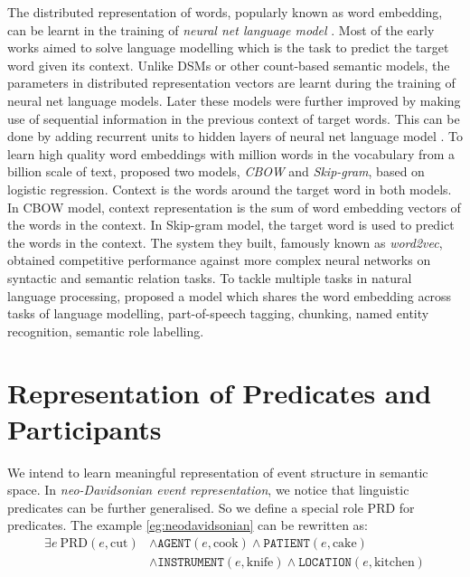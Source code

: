 \documentclass[a4paper]{article}
\begin{document}
The distributed representation of words, popularly known as word embedding, can be learnt in the training of \textit{neural net language model} \citep{bengio2003neural}. Most of the early works aimed to solve language modelling which is the task to predict the target word given its context. Unlike DSMs or other count-based semantic models, the parameters in distributed representation vectors are learnt during the training of neural net language models. Later these models were further improved by making use of sequential information in the previous context of target words. This can be done by adding recurrent units to hidden layers of neural net language model \citep{mikolov2010recurrent}. To learn high quality word embeddings with million words in the vocabulary from a billion scale of text, \citet{mikolov2013efficient} proposed two models, \textit{CBOW} and \textit{Skip-gram}, based on logistic regression. Context is the words around the target word in both models. In CBOW model, context representation is the sum of word embedding vectors of the words in the context. In Skip-gram model, the target word is used to predict the words in the context. The system they built, famously known as \textit{word2vec}, obtained competitive performance against more complex neural networks on syntactic and semantic relation tasks. To tackle multiple tasks in natural language processing, \citet{collobert2011natural} proposed a model which shares the word embedding across tasks of language modelling, part-of-speech tagging, chunking, named entity recognition, semantic role labelling. 



\newpage
\section{Representation of Predicates and Participants}
We intend to learn meaningful representation of event structure in semantic space. In \textit{neo-Davidsonian event representation}, we notice that linguistic predicates can be further generalised. So we define a special role PRD for predicates. The example \ref{eg:neodavidsonian} can be rewritten as: 
\begin{equation*} \label{eg:symbolic-thematic}
\begin{aligned}
    \exists e\ \text{PRD}(e, \text{cut})
    & \land \texttt{AGENT}(e, \text{cook}) \land \texttt{PATIENT}(e, \text{cake}) \\
    & \land \texttt{INSTRUMENT}(e, \text{knife}) \land \texttt{LOCATION}(e, \text{kitchen}) \\
\end{aligned}
\end{equation*}
\end{document}
